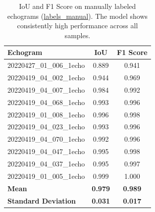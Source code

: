 \documentclass[11pt,oneside,openany]{article}
\begin{document}
\begin{table}[H]
\centering
\caption{IoU and F1 Score on manually labeled echograms (\href{https://github.com/Mohammad-Neutrino/EECS836_Machine_Learning/tree/trunk/Project/data/labels_manual}{labels\_manual}). The model shows consistently high performance across all samples.}
\label{tab:manual_eval}
\vspace{0.5em}
\renewcommand{\arraystretch}{1.3} %
\setlength{\tabcolsep}{12pt} %
\begin{tabular}{|l|c|c|}
\hline
\textbf{Echogram} & \textbf{IoU} & \textbf{F1 Score} \\
\hline
20220427\_01\_006\_1echo & 0.889 & 0.941 \\
20220419\_04\_002\_1echo & 0.944 & 0.969 \\
20220419\_04\_007\_1echo & 0.984 & 0.992 \\
20220419\_04\_068\_1echo & 0.993 & 0.996 \\
20220419\_01\_008\_1echo & 0.996 & 0.998 \\
20220419\_04\_023\_1echo & 0.993 & 0.996 \\
20220419\_04\_070\_1echo & 0.992 & 0.996 \\
20220419\_04\_047\_1echo & 0.995 & 0.998 \\
20220419\_04\_037\_1echo & 0.995 & 0.997 \\
20220419\_01\_005\_1echo & 0.999 & 1.000 \\
\hline
\textbf{Mean} & \textbf{0.979} & \textbf{0.989} \\
\textbf{Standard Deviation} & \textbf{0.031} & \textbf{0.017} \\
\hline
\end{tabular}
\end{table}
\end{document}
